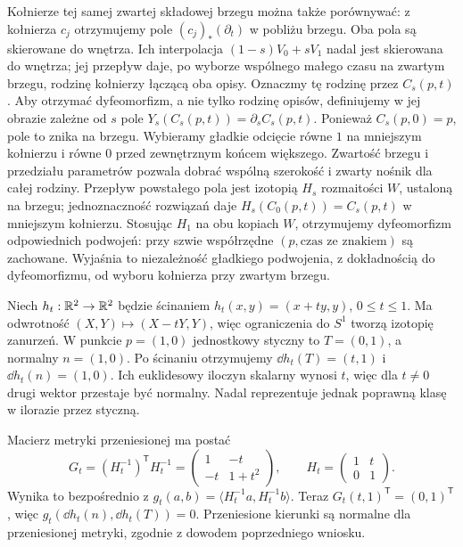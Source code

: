 Kołnierze tej samej zwartej
składowej brzegu można także
porównywać: z kołnierza $c_j$
otrzymujemy pole
$(c_j)_*(\partial_t)$ w pobliżu
brzegu. Oba pola są skierowane
do wnętrza. Ich interpolacja
$(1-s)V_0+sV_1$ nadal jest
skierowana do wnętrza;
jej przepływ daje, po wyborze
wspólnego małego czasu na
zwartym brzegu, rodzinę
kołnierzy łączącą oba opisy.
Oznaczmy tę rodzinę przez $C_s(p,t)$. Aby otrzymać
dyfeomorfizm, a nie tylko rodzinę opisów, definiujemy
w jej obrazie zależne od $s$ pole
$Y_s(C_s(p,t))=\partial_s C_s(p,t)$.
Ponieważ $C_s(p,0)=p$, pole to znika na brzegu.
Wybieramy gładkie odcięcie równe $1$ na mniejszym
kołnierzu i równe $0$ przed zewnętrznym końcem większego.
Zwartość brzegu i przedziału parametrów pozwala dobrać
wspólną szerokość i zwarty nośnik dla całej rodziny.
Przepływ powstałego pola jest izotopią $H_s$ rozmaitości
$W$, ustaloną na brzegu; jednoznaczność rozwiązań daje
$H_s(C_0(p,t))=C_s(p,t)$ w mniejszym kołnierzu.
Stosując $H_1$ na obu kopiach $W$, otrzymujemy
dyfeomorfizm odpowiednich podwojeń: przy szwie
współrzędne $(p,\text{czas ze znakiem})$ są zachowane.
Wyjaśnia to niezależność gładkiego podwojenia, z dokładnością
do dyfeomorfizmu, od wyboru kołnierza przy zwartym brzegu.

\begin{przyklad}
\label{prz:izotopia-scinanie-20}
Niech $h_t:\mathbb{R}^2\to\mathbb{R}^2$ będzie ścinaniem
$h_t(x,y)=(x+ty,y)$, $0\leq t\leq1$.
Ma odwrotność $(X,Y)\mapsto(X-tY,Y)$,
więc ograniczenia do $S^1$ tworzą izotopię zanurzeń.
W punkcie $p=(1,0)$ jednostkowy styczny to $T=(0,1)$,
a normalny $n=(1,0)$. Po ścinaniu otrzymujemy
$\dd h_t(T)=(t,1)$ i $\dd h_t(n)=(1,0)$.
Ich euklidesowy iloczyn skalarny wynosi $t$,
więc dla $t\ne0$ drugi wektor przestaje być normalny.
Nadal reprezentuje jednak poprawną klasę w ilorazie przez styczną.

Macierz metryki przeniesionej ma postać
\[
 G_t=(H_t^{-1})^{\mathsf T}H_t^{-1}
 =\begin{pmatrix}1&-t\\-t&1+t^2\end{pmatrix},
 \qquad H_t=\begin{pmatrix}1&t\\0&1\end{pmatrix}.
\]
Wynika to bezpośrednio z
$g_t(a,b)=\langle H_t^{-1}a,H_t^{-1}b\rangle$.
Teraz $G_t(t,1)^{\mathsf T}=(0,1)^{\mathsf T}$,
więc $g_t(\dd h_t(n),\dd h_t(T))=0$.
Przeniesione kierunki są normalne dla przeniesionej metryki,
zgodnie z dowodem poprzedniego wniosku.
\end{przyklad}

